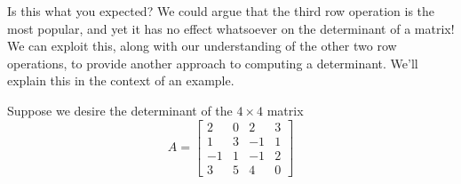\documentclass{ximera}
\begin{document}
Is this what you expected?  We could argue that the third row
operation is the most popular, and yet it has no effect whatsoever on
the determinant of a matrix!  We can exploit this, along with our
understanding of the other two row operations, to provide another
approach to computing a determinant.  We'll explain this in the
context of an example.

\begin{example}

  Suppose we desire the determinant of the $4\times 4$ matrix
  \[
    A=
    \begin{bmatrix}
      2 & 0 & 2 & 3 \\
      1 & 3 &-1 & 1 \\
      -1& 1 &-1 & 2 \\
      3 & 5 & 4 & 0
    \end{bmatrix}
  \]


\end{example}
\end{document}
